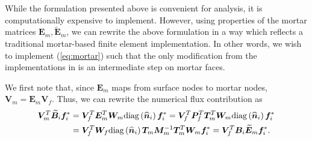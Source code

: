 \documentclass[review]{siamart0216}
\renewcommand{\tilde}{\widetilde}
\renewcommand{\hat}{\widehat}
\newcommand{\LRp}[1]{\left( #1 \right)}
\newcommand{\diag}[1]{{\rm diag}\LRp{#1}}
\begin{document}
While the formulation presented above is convenient for analysis, it is computationally expensive to implement.  However, using properties of the mortar matrices $\bm{E}_m, \tilde{\bm{E}}_m$, we can rewrite the above formulation in a way which reflects a traditional mortar-based finite element implementation.  In other words, we wish to implement (\ref{eq:mortar}) such that the only modification from the implementations in \cite{chan2017discretely} is an intermediate step on mortar faces.  

We first note that, since $\bm{E}_m$ maps from surface nodes to mortar nodes, $\bm{V}_m = \bm{E}_m \bm{V}_f$.  Thus, we can rewrite the numerical flux contribution as
\begin{align*}
 \bm{V}_m^T\tilde{\bm{B}}_i\bm{f}_i^* &= \bm{V}_f^T \bm{E}_m^T \bm{W}_m\diag{\hat{\bm{n}}_i} \bm{f}_i^* = \bm{V}_f^T  \bm{P}_f^T\bm{T}_m^T\bm{W}_m\diag{\hat{\bm{n}}_i} \bm{f}_i^*\\
 &= \bm{V}_f^T \bm{W}_f \diag{\hat{\bm{n}}_i} \bm{T}_m\bm{M}_m^{-1}\bm{T}_m^T\bm{W}_m \bm{f}_i^* =  \bm{V}_f^T \bm{B}_i \tilde{\bm{E}}_m\bm{f}_i^*.
\end{align*}
\end{document}
